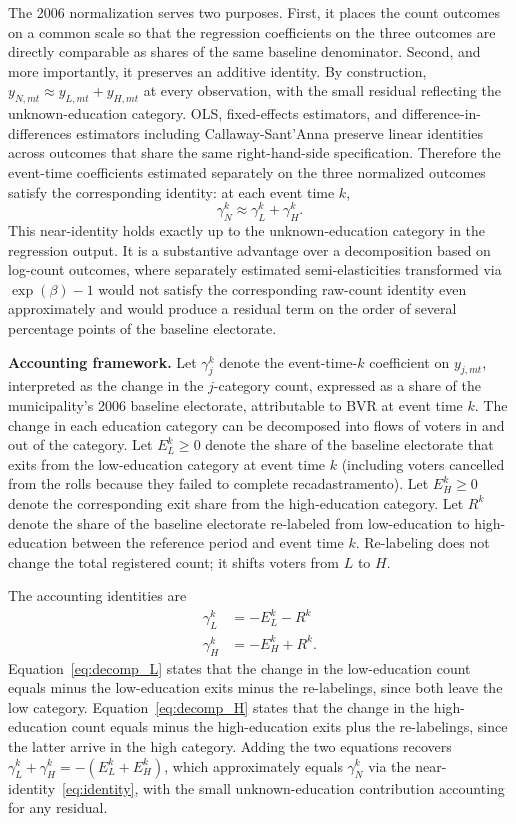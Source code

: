The 2006 normalization serves two purposes. First, it places the count outcomes on a common scale so that the regression coefficients on the three outcomes are directly comparable as shares of the same baseline denominator. Second, and more importantly, it preserves an additive identity. By construction, $y_{N,mt} \approx y_{L,mt} + y_{H,mt}$ at every observation, with the small residual reflecting the unknown-education category. OLS, fixed-effects estimators, and difference-in-differences estimators including Callaway-Sant'Anna preserve linear identities across outcomes that share the same right-hand-side specification. Therefore the event-time coefficients estimated separately on the three normalized outcomes satisfy the corresponding identity: at each event time $k$,
\begin{equation}
\gamma_N^k \approx \gamma_L^k + \gamma_H^k.
\label{eq:identity}
\end{equation}
This near-identity holds exactly up to the unknown-education category in the regression output. It is a substantive advantage over a decomposition based on log-count outcomes, where separately estimated semi-elasticities transformed via $\exp(\beta) - 1$ would not satisfy the corresponding raw-count identity even approximately and would produce a residual term on the order of several percentage points of the baseline electorate.

\textbf{Accounting framework.} Let $\gamma_j^k$ denote the event-time-$k$ coefficient on $y_{j,mt}$, interpreted as the change in the $j$-category count, expressed as a share of the municipality's 2006 baseline electorate, attributable to BVR at event time $k$. The change in each education category can be decomposed into flows of voters in and out of the category. Let $E_L^k \geq 0$ denote the share of the baseline electorate that exits from the low-education category at event time $k$ (including voters cancelled from the rolls because they failed to complete recadastramento). Let $E_H^k \geq 0$ denote the corresponding exit share from the high-education category. Let $R^k$ denote the share of the baseline electorate re-labeled from low-education to high-education between the reference period and event time $k$. Re-labeling does not change the total registered count; it shifts voters from $L$ to $H$.

The accounting identities are
\begin{align}
\gamma_L^k &= -E_L^k - R^k \label{eq:decomp_L}\\
\gamma_H^k &= -E_H^k + R^k. \label{eq:decomp_H}
\end{align}
Equation~\eqref{eq:decomp_L} states that the change in the low-education count equals minus the low-education exits minus the re-labelings, since both leave the low category. Equation~\eqref{eq:decomp_H} states that the change in the high-education count equals minus the high-education exits plus the re-labelings, since the latter arrive in the high category. Adding the two equations recovers $\gamma_L^k + \gamma_H^k = -(E_L^k + E_H^k)$, which approximately equals $\gamma_N^k$ via the near-identity~\eqref{eq:identity}, with the small unknown-education contribution accounting for any residual.

